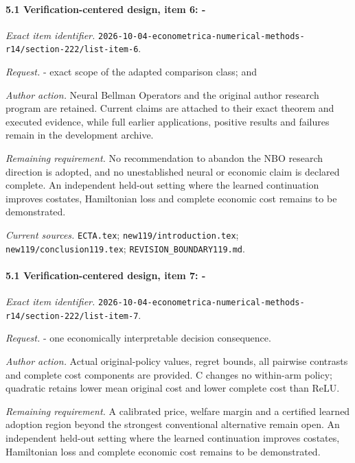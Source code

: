 \paragraph{5.1 Verification-centered design, item 6: -}

\emph{Exact item identifier.} \nolinkurl{2026-10-04-econometrica-numerical-methods-r14/section-222/list-item-6}.

\par\emph{Request.} - exact scope of the adapted comparison class; and

\par\emph{Author action.} Neural Bellman Operators and the original author research program are retained. Current claims are attached to their exact theorem and executed evidence, while full earlier applications, positive results and failures remain in the development archive.

\par\emph{Remaining requirement.} No recommendation to abandon the NBO research direction is adopted, and no unestablished neural or economic claim is declared complete. An independent held-out setting where the learned continuation improves costates, Hamiltonian loss and complete economic cost remains to be demonstrated.

\par\emph{Current sources.} \nolinkurl{ECTA.tex}; \nolinkurl{new119/introduction.tex}; \nolinkurl{new119/conclusion119.tex}; \nolinkurl{REVISION_BOUNDARY119.md}.

\paragraph{5.1 Verification-centered design, item 7: -}

\emph{Exact item identifier.} \nolinkurl{2026-10-04-econometrica-numerical-methods-r14/section-222/list-item-7}.

\par\emph{Request.} - one economically interpretable decision consequence.

\par\emph{Author action.} Actual original-policy values, regret bounds, all pairwise contrasts and complete cost components are provided. C changes no within-arm policy; quadratic retains lower mean original cost and lower complete cost than ReLU.

\par\emph{Remaining requirement.} A calibrated price, welfare margin and a certified learned adoption region beyond the strongest conventional alternative remain open. An independent held-out setting where the learned continuation improves costates, Hamiltonian loss and complete economic cost remains to be demonstrated.

